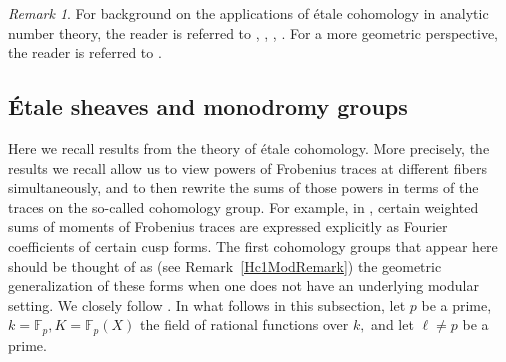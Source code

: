 \documentclass[12pt]{amsart}
\theoremstyle{definition}
\theoremstyle{remark}
\newtheorem{remark}[theorem]{Remark}
\numberwithin{equation}{section}
\def\F{{\mathbb F}}
\def\F{\mathbb{F}}
\begin{document}
\begin{remark}
    For background on the applications of \'etale cohomology in analytic number theory, the reader is referred to \cite{AppliedladicCohomology}, \cite{traceFunctionsFFApplications}, \cite{StudySumsProducts}, \cite{KatzESFDEC}. For a more geometric perspective, the reader is referred to \cite{ECMilneBook}.
\end{remark}



\subsection{\'Etale sheaves and monodromy groups}\label{SubsectionGenericEtale}

Here we recall results from the theory of \'etale cohomology. More precisely, the results we recall allow us to view powers of Frobenius traces at different fibers simultaneously, and to then rewrite the sums of those powers in terms of the traces on the so-called cohomology group. For example, in \cite{HGFDistributionOnoSaikia,ono2024distributionhessianvaluesgaussian,grove2024hypergeometricmomentshecketrace}, certain weighted sums of moments of Frobenius traces are expressed explicitly as Fourier coefficients of certain cusp forms. The first cohomology groups that appear here should be thought of as (see Remark~\ref{Hc1ModRemark}) the geometric generalization of these forms when one does not have an underlying modular setting. We closely follow \cite{AppliedladicCohomology}. In what follows in this subsection, let $p$ be a prime, $k=\F_p, K=\F_p(X)$ the field of rational functions over $k,$ and let $\ell\neq p$ be a prime.  
\end{document}
